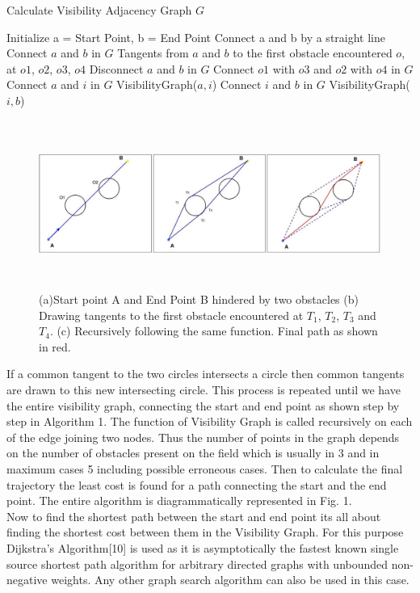 \documentclass[letterpaper, 10 pt, conference]{ieeeconf}  %
\begin{document}
\begin{algorithm}
\caption{Calculate Visibility Adjacency Graph $G$}
\begin{algorithmic}[1]
\State Initialize a = Start Point, b = End Point
\State Connect a and b by a straight line
\State Connect $a$ and $b$ in $G$ 
\State Tangents from $a$ and $b$ to the first obstacle
encountered $o$, at $o1$, $o2$, $o3$, $o4$
\State Disconnect $a$ and $b$ in $G$
\State Connect $o1$ with $o3$ and $o2$ with $o4$ in $G$
\State Connect $a$ and $i$ in $G$
\State VisibilityGraph($a,i$)
\EndFor
{}
\State Connect $i$ and $b$ in $G$
\State VisibilityGraph($i,b$)
\EndFor
\EndIf
\EndProcedure
\end{algorithmic}
\end{algorithm}



\begin{figure} 
\centering
\includegraphics[width=\textwidth,height=5.5cm]{path_paper.jpg}
\caption{(a)Start point A and End Point B hindered by two obstacles (b) Drawing tangents to the first obstacle encountered at $T_{1}$, $T_{2}$, $T_{3}$ and $T_{4}$. (c) Recursively following the same function. Final path as shown in red. }
\end{figure}


If a common tangent to the two circles intersects a circle then common tangents are drawn to this new intersecting circle. This process is repeated until we have the entire visibility graph, connecting the start and end point as shown step by step in Algorithm 1. The function of Visibility Graph is called recursively on each of the edge joining two nodes. Thus the number of points in the graph depends on the number of obstacles present on the field which is usually in 3 and in maximum cases 5 including possible erroneous cases. Then to calculate the final trajectory the least cost is found for a path connecting the start and the end point. The entire algorithm is diagrammatically represented in Fig. 1.\\
Now to find the shortest path between the start and end point its all about finding the shortest cost between them in the Visibility Graph. For this purpose Dijkstra's Algorithm[10] is used as it is asymptotically the fastest known single source shortest path algorithm for arbitrary directed graphs with unbounded non-negative weights. Any other graph search algorithm can also be used in this case. 
\end{document}

